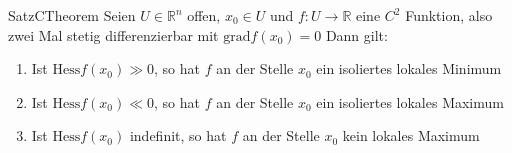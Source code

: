  \begin{ibox}[43]{Satz}{CTheorem}
     Seien $ U \in  \mathbb{R}^n  $ offen, $ x_0 \in U $ und $ f: U \to \mathbb{R}  $ eine $ C^{2} $ Funktion, also zwei Mal
		 stetig differenzierbar mit $ \text{grad} f \left(x_0\right)  = 0 $ 
		 Dann gilt:
		 \begin{enumerate}[label=\alph*)]
			 \item Ist $ \text{Hess} f \left(x_0\right) \gg 0	 $, so hat $ f $ an der Stelle $ x_0 $ ein isoliertes lokales Minimum
			 \item Ist $ \text{Hess} f \left(x_0\right) \ll 0	 $, so hat $ f $ an der Stelle $ x_0 $ ein isoliertes lokales Maximum
			 \item Ist $ \text{Hess} f \left(x_0\right) $ indefinit, so hat $ f $ an der Stelle $ x_0 $ kein lokales Maximum
		 \end{enumerate}
 \end{ibox}
